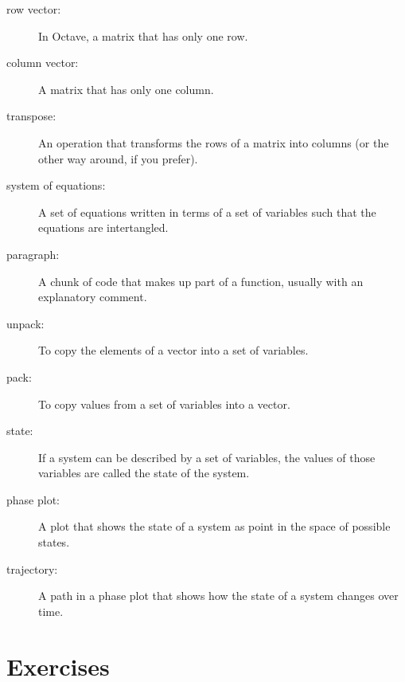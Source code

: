 \documentclass{book}
\begin{document}
\begin{description}

\item[row vector:] In Octave, a matrix that has only one row. 

\item[column vector:] A matrix that has only one column. 

\item[transpose:] An operation that transforms the rows of a matrix
into columns (or the other way around, if you prefer). 

\item[system of equations:] A set of equations written in terms of
a set of variables such that the equations are intertangled.

\item[paragraph:] A chunk of code that makes up part of a function,
usually with an explanatory comment. 

\item[unpack:] To copy the elements of a vector into a set of variables.

\item[pack:] To copy values from a set of variables into a vector. 

\item[state:] If a system can be described by a set of variables,
the values of those variables are called the state of the system.

\item[phase plot:] A plot that shows the state of a system as point
in the space of possible states. 

\item[trajectory:] A path in a phase plot that shows how the state of
a system changes over time.


\end{description}

\section{Exercises}
\end{document}
